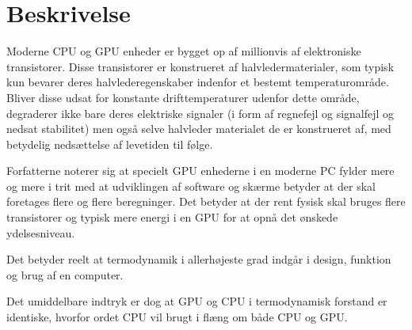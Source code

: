 \section{Beskrivelse}

Moderne CPU og GPU enheder er bygget op af millionvis af elektroniske transistorer.  Disse transistorer er konstrueret af halvledermaterialer, som typisk kun bevarer deres halvlederegenskaber indenfor et bestemt temperaturområde. Bliver disse udsat for konstante drifttemperaturer udenfor dette område, degraderer ikke bare deres elektriske signaler (i form af regnefejl og signalfejl og nedsat stabilitet) men også selve halvleder materialet de er konstrueret af, med betydelig nedsættelse af levetiden til følge.


Forfatterne noterer sig at specielt GPU enhederne i en moderne PC fylder mere og mere i trit med at udviklingen af software og skærme betyder at der skal foretages flere og flere beregninger. Det betyder at der rent fysisk skal bruges flere transistorer og typisk mere energi i en GPU for at opnå det ønskede ydelsesniveau.

Det betyder reelt at termodynamik i allerhøjeste grad indgår i design, funktion og brug af en computer.

Det umiddelbare indtryk er dog at GPU og CPU i termodynamisk forstand er identiske, hvorfor ordet CPU vil brugt i flæng om både CPU og GPU.


